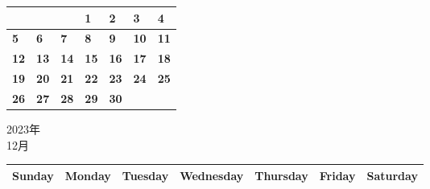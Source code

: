 \documentclass[a4paper,landscape]{jsarticle}
\newcommand{\dig}{\hspace{29mm}}
\newcommand{\tdig}{\hspace{27mm}}
\newcommand{\LBF}{\LARGE\textbf}
\begin{document}
\begingroup
\renewcommand{\arraystretch}{4}
\begin{tabular}{|p{32mm}|p{32mm}|p{32mm}|p{32mm}|p{32mm}|p{32mm}|p{32mm}|}
\hline
&&&\raisebox{30pt} {\dig\LBF{1}}&\raisebox{30pt} {\dig\LBF{2}}&\raisebox{30pt} {\dig\LBF{3}}&\raisebox{30pt} {\dig\LBF{4}}\\
\hline
\raisebox{30pt} {\dig\LBF{5}}&\raisebox{30pt} {\dig\LBF{6}}&\raisebox{30pt} {\dig\LBF{7}}&\raisebox{30pt} {\dig\LBF{8}}&\raisebox{30pt} {\dig\LBF{9}}&\raisebox{30pt} {\tdig\LBF{10}}&\raisebox{30pt} {\tdig\LBF{11}}\\
\hline
\raisebox{30pt} {\tdig\LBF{12}}&\raisebox{30pt} {\tdig\LBF{13}}&\raisebox{30pt} {\tdig\LBF{14}}&\raisebox{30pt} {\tdig\LBF{15}}&\raisebox{30pt} {\tdig\LBF{16}}&\raisebox{30pt} {\tdig\LBF{17}}&\raisebox{30pt} {\tdig\LBF{18}}\\
\hline
\raisebox{30pt} {\tdig\LBF{19}}&\raisebox{30pt} {\tdig\LBF{20}}&\raisebox{30pt} {\tdig\LBF{21}}&\raisebox{30pt} {\tdig\LBF{22}}&\raisebox{30pt} {\tdig\LBF{23}}&\raisebox{30pt} {\tdig\LBF{24}}&\raisebox{30pt} {\tdig\LBF{25}}\\
\hline
\raisebox{30pt} {\tdig\LBF{26}}&\raisebox{30pt} {\tdig\LBF{27}}&\raisebox{30pt} {\tdig\LBF{28}}&\raisebox{30pt} {\tdig\LBF{29}}&\raisebox{30pt} {\tdig\LBF{30}}&&\\
\hline
\end{tabular}
\endgroup
\newpage\begin{center}
	\LARGE 2023年\\
	\LARGE 12月
\end{center}

\begingroup
\renewcommand{\arraystretch}{1.4}
\begin{tabular}{|>{\centering\arraybackslash}p{32mm}|>{\centering\arraybackslash}p{32mm}|>{\centering\arraybackslash}p{32mm}|>{\centering\arraybackslash}p{32mm}|>{\centering\arraybackslash}p{32mm}|>{\centering\arraybackslash}p{32mm}|>{\centering\arraybackslash}p{32mm}|}
\hline
\large Sunday&\large Monday &\large Tuesday&\large Wednesday&\large Thursday&\large Friday&\large Saturday\\
\hline
\end{tabular}
\endgroup
\end{document}
